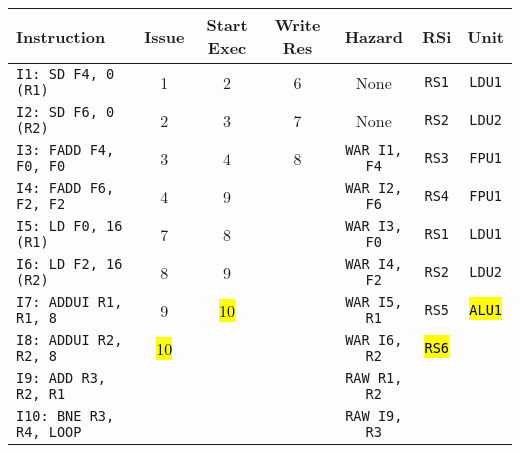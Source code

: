 \begin{enumerate}
    \begin{table}[!htp]
        \centering
        \begin{adjustbox}{width={\textwidth},totalheight={\textheight},keepaspectratio}
        \begin{tabular}{@{} l c c c c c c @{}}
            \toprule
            \textbf{Instruction} & \textbf{Issue} & \textbf{Start Exec} & \textbf{Write Res} & \textbf{Hazard} & \textbf{RSi} & \textbf{Unit} \\
            \midrule
            \texttt{I1: SD F4, 0 (R1)}      & 1 & 2 & 6 & None  & \texttt{RS1}   & \texttt{LDU1}  \\ [.5em]
            \texttt{I2: SD F6, 0 (R2)}      & 2 & 3 & 7 & None  & \texttt{RS2}   & \texttt{LDU2}  \\ [.5em]
            \texttt{I3: FADD F4, F0, F0}    & 3 & 4 & 8 & \texttt{WAR I1, F4}  & \texttt{RS3} & \texttt{FPU1} \\ [.5em]
            \texttt{I4: FADD F6, F2, F2}    & 4 & 9 &   & \texttt{WAR I2, F6} & \texttt{RS4} & \texttt{FPU1} \\ [.5em]
            \texttt{I5: LD F0, 16 (R1)}     & 7 & 8 &   & \texttt{WAR I3, F0} & \texttt{RS1} & \texttt{LDU1} \\ [.5em]
            \texttt{I6: LD F2, 16 (R2)}     & 8 & 9 &   & \texttt{WAR I4, F2} & \texttt{RS2} & \texttt{LDU2} \\ [.5em]
            \texttt{I7: ADDUI R1, R1, 8}    & 9 & \hl{10} &   & \texttt{WAR I5, R1} & \texttt{RS5} & \hl{\texttt{ALU1}} \\ [.5em]
            \texttt{I8: ADDUI R2, R2, 8}    & \hl{10} &   &   & \texttt{WAR I6, R2} & \hl{\texttt{RS6}} &       \\ [.5em]
            \texttt{I9: ADD R3, R2, R1}     &   &   &   & \texttt{RAW R1, R2} &       &       \\ [.5em]
            \texttt{I10: BNE R3, R4, LOOP}   &   &   &   & \texttt{RAW I9, R3} &       &       \\
            \bottomrule
        \end{tabular}
        \end{adjustbox}
    \end{table}
    

\end{enumerate}
